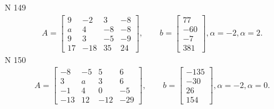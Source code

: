 \documentclass[11pt]{report}
\begin{document}
N 149
\begin{align*}
 A = \left[\begin{matrix}9 & -2 & 3 & -8\\a & 4 & -8 & -8\\9 & 3 & -5 & -9\\17 & -18 & 35 & 24\end{matrix}\right],
    \qquad b = \left[\begin{matrix}77\\-60\\-7\\381\end{matrix}\right], \alpha = -2, \alpha = 2. 
 \end{align*}
N 150
\begin{align*}
 A = \left[\begin{matrix}-8 & -5 & 5 & 6\\3 & a & 3 & 6\\-1 & 4 & 0 & -5\\-13 & 12 & -12 & -29\end{matrix}\right],
    \qquad b = \left[\begin{matrix}-135\\-30\\26\\154\end{matrix}\right], \alpha = -2, \alpha = 0. 
 \end{align*}
\end{document}
